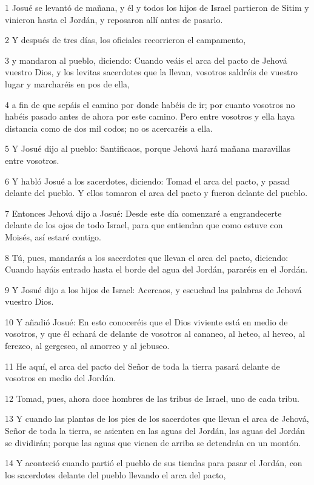 \par 1 Josué se levantó de mañana, y él y todos los hijos de Israel partieron de Sitim y vinieron hasta el Jordán, y reposaron allí antes de pasarlo.
\par 2 Y después de tres días, los oficiales recorrieron el campamento,
\par 3 y mandaron al pueblo, diciendo: Cuando veáis el arca del pacto de Jehová vuestro Dios, y los levitas sacerdotes que la llevan, vosotros saldréis de vuestro lugar y marcharéis en pos de ella,
\par 4 a fin de que sepáis el camino por donde habéis de ir; por cuanto vosotros no habéis pasado antes de ahora por este camino. Pero entre vosotros y ella haya distancia como de dos mil codos;  no os acercaréis a ella.
\par 5 Y Josué dijo al pueblo: Santificaos, porque Jehová hará mañana maravillas entre vosotros.
\par 6 Y habló Josué a los sacerdotes, diciendo: Tomad el arca del pacto, y pasad delante del pueblo. Y ellos tomaron el arca del pacto y fueron delante del pueblo.
\par 7 Entonces Jehová dijo a Josué: Desde este día comenzaré a engrandecerte delante de los ojos de todo Israel, para que entiendan que como estuve con Moisés, así estaré contigo.
\par 8 Tú, pues, mandarás a los sacerdotes que llevan el arca del pacto, diciendo: Cuando hayáis entrado hasta el borde del agua del Jordán, pararéis en el Jordán.
\par 9 Y Josué dijo a los hijos de Israel: Acercaos, y escuchad las palabras de Jehová vuestro Dios.
\par 10 Y añadió Josué: En esto conoceréis que el Dios viviente está en medio de vosotros, y que él echará de delante de vosotros al cananeo, al heteo, al heveo, al ferezeo, al gergeseo, al amorreo y al jebuseo.
\par 11 He aquí, el arca del pacto del Señor de toda la tierra pasará delante de vosotros en medio del Jordán.
\par 12 Tomad, pues, ahora doce hombres de las tribus de Israel, uno de cada tribu.
\par 13 Y cuando las plantas de los pies de los sacerdotes que llevan el arca de Jehová, Señor de toda la tierra, se asienten en las aguas del Jordán, las aguas del Jordán se dividirán; porque las aguas que vienen de arriba se detendrán en un montón.
\par 14 Y aconteció cuando partió el pueblo de sus tiendas para pasar el Jordán, con los sacerdotes delante del pueblo llevando el arca del pacto,

